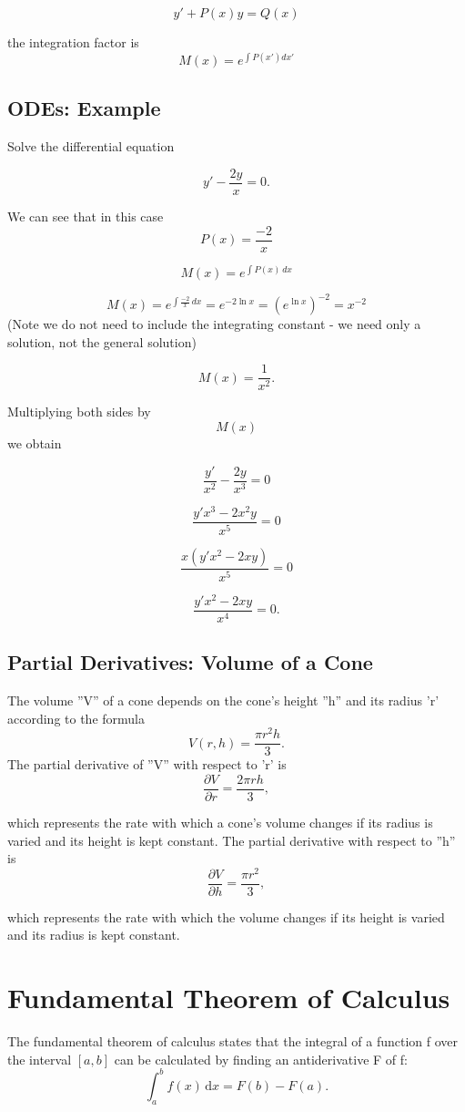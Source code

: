 \documentclass[12pt, a4paper]{article}
\begin{document}
\[ y'+ P(x)y = Q(x)\]

the integration factor is 
\[M(x) = e^{\int P(x') dx'}\]


\subsection*{ODEs: Example}

Solve the differential equation

\[y'-\frac{2y}{x} = 0.\]

We can see that in this case \[P(x) = \frac{-2}{x}\]

\[ M(x)=e^{\int P(x)\,dx}\]

\[ M(x)=e^{\int \frac{-2}{x}\,dx} = e^{-2 \ln x} = {(e^{\ln x})}^{-2} = x^{-2} \] (Note we do not need to include the integrating constant - we need only a solution, not the general solution)

\[ M(x)=\frac{1}{x^2}.\]

Multiplying both sides by \[M(x)\] we obtain

\[\frac{y'}{x^2} - \frac{2y}{x^3} = 0\]

\[\frac{y'x^3 - 2x^2y}{x^5} = 0\]

\[\frac{x(y'x^2 - 2xy)}{x^5} = 0\]

\[\frac{y'x^2 - 2xy}{x^4} = 0.\]


\subsection{Partial Derivatives: Volume of a Cone}

The volume ''V'' of a cone depends on the cone's height ''h'' and its radius 'r' according to the formula
\[V(r, h) = \frac{\pi r^2 h}{3}.\]
The partial derivative of ''V'' with respect to 'r' is
\[\frac{ \partial V}{\partial r} = \frac{ 2 \pi r h}{3},\]

which represents the rate with which a cone's volume changes if its radius is varied and its height is kept constant.
The partial derivative with respect to ''h'' is
\[\frac{ \partial V}{\partial h} = \frac{\pi r^2}{3},\]

which represents the rate with which the volume changes if its height is varied and its radius is kept constant.
\section{Fundamental Theorem of Calculus}
The fundamental theorem of calculus states that the integral of a function f over the interval $[a, b]$ can be calculated by finding an antiderivative F of f:
\[\int_a^b f(x)\,\mathrm dx = F(b) - F(a).\]
\end{document}
